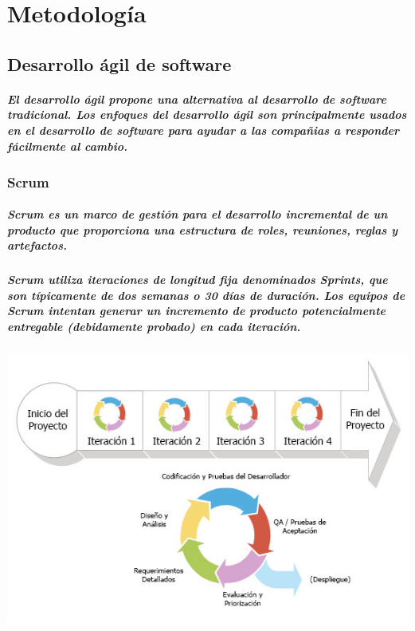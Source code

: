 \clearpage
\chapter{Metodología}

\section{Desarrollo ágil de software}
  \paragraph{El desarrollo ágil propone una alternativa al desarrollo de software tradicional. Los enfoques del desarrollo ágil son principalmente usados en el desarrollo de software para ayudar a las compañias a responder fácilmente al cambio.}\cite{22}

\subsection{Scrum}
  \paragraph{Scrum es un marco de gestión para el desarrollo incremental de un producto que proporciona una estructura de roles, reuniones, reglas y artefactos.}
  \paragraph{Scrum utiliza iteraciones de longitud fija denominados Sprints, que son típicamente de dos semanas o 30 días de duración. Los equipos de Scrum intentan generar un incremento de producto potencialmente entregable (debidamente probado) en cada iteración.}\cite{23}
  
  \begin{center}
    \includegraphics[width=14cm, height=9cm]{images/iterations}
  \end{center}

